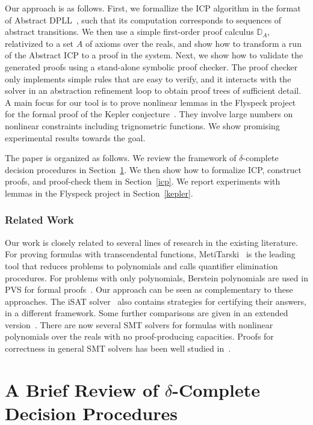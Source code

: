 \documentclass[envcountsect]{llncs}
\begin{document}
Our approach is as follows. First, we formallize the ICP algorithm in the
format of Abstract DPLL~\cite{DBLP:journals/jacm/NieuwenhuisOT06}, such that its computation corresponds to
sequences of abstract transitions. We then use a simple first-order proof
calculus $\mathbb{D}_A$, relativized to a set $A$ of axioms over the reals, and
show how to transform a run of the Abstract ICP to a proof in the system. Next,
we show how to validate the generated proofs using a stand-alone symbolic proof
checker. The proof checker only implements simple rules that are easy to verify,
and it interacts with the solver in an abstraction refinement loop to obtain
proof trees of sufficient detail. A main focus for our tool is to prove
nonlinear lemmas
in the Flyspeck project for the formal proof of the Kepler
conjecture~\cite{DBLP:journals/dcg/HalesHMNOZ10,DBLP:conf/dagstuhl/Hales05}. They
involve large numbers on nonlinear constraints including trignometric functions. We show
promising experimental results towards the goal.

The paper is organized as follows. We review the framework of $\delta$-complete
decision procedures in Section~\ref{review}. We then show how to formalize ICP,
construct proofs, and proof-check them in Section~\ref{icp}. We
report experiments with lemmas in the Flyspeck project in Section~\ref{kepler}.

\subsubsection{Related Work} Our work is closely related to several lines
of research in the existing literature. For proving formulas with
transcendental functions,
MetiTarski~\cite{DBLP:conf/itp/Paulson12,DBLP:journals/jar/AkbarpourP10,DBLP:conf/aisc/PassmorePM12} 
is the leading tool that reduces problems to
polynomials and calls quantifier elimination procedures. For problems with only
polynomials, Berstein polynomials are used in PVS for formal
proofs~\cite{MN12}. Our approach can be seen as complementary to these
approaches. The iSAT solver~\cite{HySAT} also contains strategies for certifying
their answers, in a different framework. Some further comparisons are given in an extended version~\cite{cade2013extended}. There are now several SMT solvers for formulas with nonlinear polynomials over
the reals with no proof-producing capacities. Proofs for
correctness in general SMT solvers has been well studied in~\cite{DBLP:journals/fmsd/StumpORHT1}. 

\section{A Brief Review of $\delta$-Complete Decision Procedures}\label{review}
\end{document}
